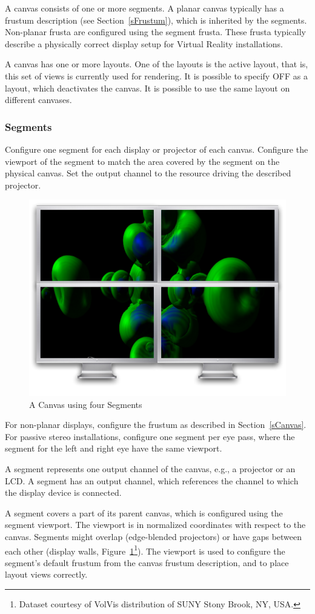 \documentclass[10pt,a4]{scrartcl}
\newcommand{\fig}[1]{Figure~\ref{#1}}
\newcommand{\sref}[1]{Section~\ref{#1}}
\begin{document}
A canvas consists of one or more segments. A planar canvas typically has
a frustum description (see \sref{sFrustum}), which is inherited by the
segments. Non-planar frusta are configured using the segment
frusta. These frusta typically describe a physically correct display
setup for Virtual Reality installations.

A canvas has one or more layouts. One of the layouts is the active
layout, that is, this set of views is currently used for rendering. It
is possible to specify \textsf{OFF} as a layout, which deactivates the
canvas. It is possible to use the same layout on different canvases.

\subsubsection{Segments}

Configure one \textsf{segment} for each display or projector of each
canvas. Configure the \textsf{viewport} of the segment to match the area
covered by the segment on the physical canvas. Set the output
\textsf{channel} to the resource driving the described projector.

\begin{figure}
  \includegraphics[width=.382\textwidth]{images/canvas.pdf}
  {\caption{\label{fCanvas}A Canvas using four Segments}}
\end{figure}

For non-planar displays, configure the frustum as described in
\sref{sCanvas}. For passive stereo installations, configure one segment
per eye pass, where the segment for the left and right eye have the same
viewport.

A segment represents one output channel of the canvas, e.g., a projector
or an LCD. A segment has an output channel, which references the channel to
which the display device is connected.

A segment covers a part of its parent canvas, which is configured using
the segment viewport. The viewport is in normalized coordinates with
respect to the canvas. Segments might overlap (edge-blended projectors)
or have gaps between each other (display walls,
\fig{fCanvas}\footnote{Dataset courtesy of VolVis distribution of SUNY
  Stony Brook, NY, USA.}). The viewport is used to configure the
segment's default frustum from the canvas frustum description, and to
place layout views correctly.
\end{document}
